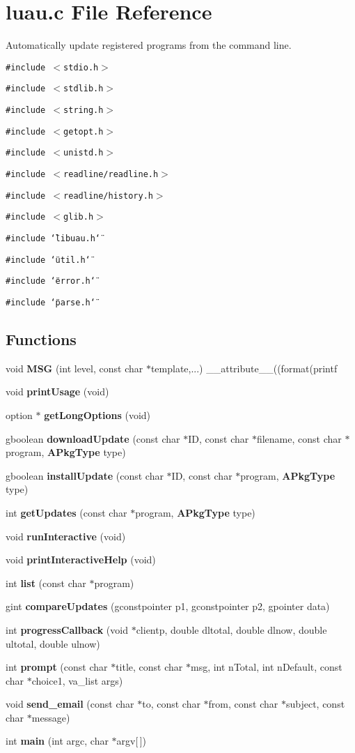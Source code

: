 \section{luau.c File Reference}
\label{luau_8c}
Automatically update registered programs from the command line.  


{\tt \#include $<$stdio.h$>$}\par
{\tt \#include $<$stdlib.h$>$}\par
{\tt \#include $<$string.h$>$}\par
{\tt \#include $<$getopt.h$>$}\par
{\tt \#include $<$unistd.h$>$}\par
{\tt \#include $<$readline/readline.h$>$}\par
{\tt \#include $<$readline/history.h$>$}\par
{\tt \#include $<$glib.h$>$}\par
{\tt \#include \char`\"{}libuau.h\char`\"{}}\par
{\tt \#include \char`\"{}util.h\char`\"{}}\par
{\tt \#include \char`\"{}error.h\char`\"{}}\par
{\tt \#include \char`\"{}parse.h\char`\"{}}\par
\subsection*{Functions}
\begin{CompactItemize}
\item 
void {\bf MSG} (int level, const char $\ast$template,...) \_\-\_\-attribute\_\-\_\-((format(printf
\item 
void {\bf print\-Usage} (void)
\item 
option $\ast$ {\bf get\-Long\-Options} (void)
\item 
gboolean {\bf download\-Update} (const char $\ast$ID, const char $\ast$filename, const char $\ast$program, {\bf APkg\-Type} type)
\item 
gboolean {\bf install\-Update} (const char $\ast$ID, const char $\ast$program, {\bf APkg\-Type} type)
\item 
int {\bf get\-Updates} (const char $\ast$program, {\bf APkg\-Type} type)
\item 
void {\bf run\-Interactive} (void)
\item 
void {\bf print\-Interactive\-Help} (void)
\item 
int {\bf list} (const char $\ast$program)
\item 
gint {\bf compare\-Updates} (gconstpointer p1, gconstpointer p2, gpointer data)
\item 
int {\bf progress\-Callback} (void $\ast$clientp, double dltotal, double dlnow, double ultotal, double ulnow)
\item 
int {\bf prompt} (const char $\ast$title, const char $\ast$msg, int n\-Total, int n\-Default, const char $\ast$choice1, va\_\-list args)
\item 
void {\bf send\_\-email} (const char $\ast$to, const char $\ast$from, const char $\ast$subject, const char $\ast$message)
\item 
int {\bf main} (int argc, char $\ast$argv[$\,$])
\end{CompactItemize}
